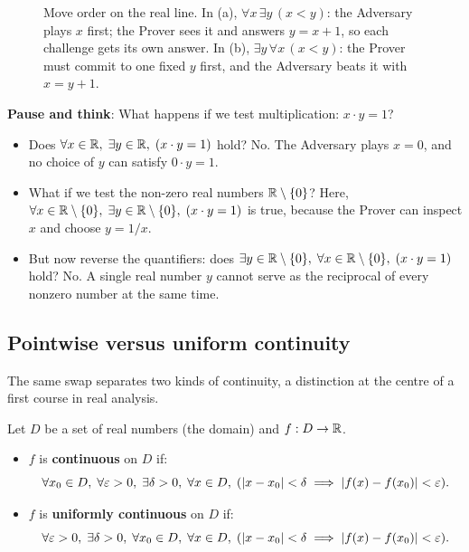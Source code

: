 \begin{figure}[htbp]
\caption{Move order on the real line. In (a), $\forall x \, \exists y \, (x < y)$: the Adversary plays $x$ first; the Prover sees it and answers $y = x+1$, so each challenge gets its own answer. In (b), $\exists y \, \forall x \, (x < y)$: the Prover must commit to one fixed $y$ first, and the Adversary beats it with $x = y+1$.}
\label{fig:qo-real-line}
\end{figure}

\begin{recoverybox}
\textbf{Pause and think}: What happens if we test multiplication: $x \cdot y = 1$?
\begin{itemize}
  \item Does $\forall x \in \mathbb{R}, \; \exists y \in \mathbb{R}, \; (x \cdot y = 1)$ hold? No. The Adversary plays $x = 0$, and no choice of $y$ can satisfy $0 \cdot y = 1$.
  \item What if we test the non-zero real numbers $\mathbb{R} \setminus \{0\}$? Here, $\forall x \in \mathbb{R} \setminus \{0\}, \; \exists y \in \mathbb{R} \setminus \{0\}, \; (x \cdot y = 1)$ is true, because the Prover can inspect $x$ and choose $y = 1/x$.
  \item But now reverse the quantifiers: does $\exists y \in \mathbb{R} \setminus \{0\}, \; \forall x \in \mathbb{R} \setminus \{0\}, \; (x \cdot y = 1)$ hold? No. A single real number $y$ cannot serve as the reciprocal of every nonzero number at the same time.
\end{itemize}
\end{recoverybox}

\subsection{Pointwise versus uniform continuity}

The same swap separates two kinds of continuity, a distinction at the centre of a first course in real analysis.

\begin{definition}
Let $D$ be a set of real numbers (the domain) and $f: D \to \mathbb{R}$.
\begin{itemize}
\item $f$ is \textbf{continuous} on $D$ if:
\[
\forall x_0 \in D, \; \forall \varepsilon > 0, \; \exists \delta > 0, \; \forall x \in D, \; (|x - x_0| < \delta \implies |f(x) - f(x_0)| < \varepsilon).
\]
\item $f$ is \textbf{uniformly continuous} on $D$ if:
\[
\forall \varepsilon > 0, \; \exists \delta > 0, \; \forall x_0 \in D, \; \forall x \in D, \; (|x - x_0| < \delta \implies |f(x) - f(x_0)| < \varepsilon).
\]
\end{itemize}
\end{definition}

